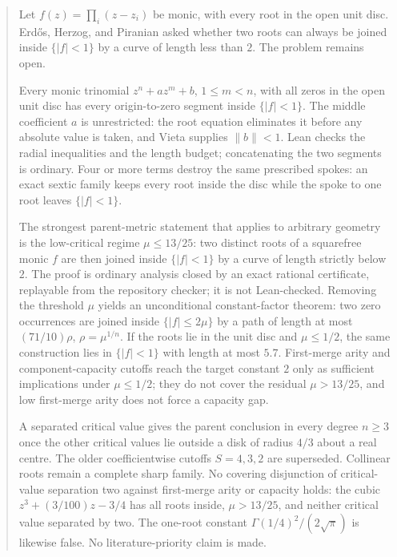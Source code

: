 
\begin{abstract}
\noindent
Let $f(z)=\prod_i(z-z_i)$ be monic, with every root in the open unit disc.
Erd\H{o}s, Herzog, and Piranian asked whether two roots can always be joined
inside $\{|f|<1\}$ by a curve of length less than $2$.  The problem remains
open.

Every monic trinomial $z^n+az^m+b$, $1\le m<n$, with all zeros in the open
unit disc has every origin-to-zero segment inside $\{|f|<1\}$.  The middle
coefficient $a$ is unrestricted: the root equation eliminates it before any
absolute value is taken, and Vieta supplies $\|b\|<1$.  Lean checks the
radial inequalities and the length budget; concatenating the two segments is
ordinary.  Four or more terms destroy the same prescribed spokes: an exact
sextic family keeps every root inside the disc while the spoke to one root
leaves $\{|f|<1\}$.

The strongest parent-metric statement that applies to arbitrary geometry is
the low-critical regime $\mu\le13/25$: two distinct roots of a squarefree
monic $f$ are then joined inside $\{|f|<1\}$ by a curve of length strictly
below $2$.  The proof is ordinary analysis closed by an exact rational
certificate, replayable from the repository checker; it is not Lean-checked.
Removing the threshold $\mu$ yields an unconditional constant-factor theorem:
two zero occurrences are joined inside $\{|f|\le2\mu\}$ by a path of length
at most $(71/10)\rho$, $\rho=\mu^{1/n}$.  If the roots lie in the unit disc
and $\mu\le1/2$, the same construction lies in $\{|f|<1\}$ with length at
most $5.7$.  First-merge arity and component-capacity cutoffs reach the
target constant $2$ only as sufficient implications under $\mu\le1/2$; they
do not cover the residual $\mu>13/25$, and low first-merge arity does not
force a capacity gap.

A separated critical value gives the parent conclusion in every degree
$n\ge3$ once the other critical values lie outside a disk of radius $4/3$
about a real centre.  The older coefficientwise cutoffs $S=4,3,2$ are
superseded.  Collinear roots remain a complete sharp family.  No covering
disjunction of critical-value separation two against first-merge arity or
capacity holds: the cubic $z^3+(3/100)z-3/4$ has all roots inside,
$\mu>13/25$, and neither critical value separated by two.  The one-root
constant $\Gamma(1/4)^2/(2\sqrt{\pi})$ is likewise false.  No
literature-priority claim is made.
\end{abstract}

